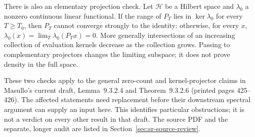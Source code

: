 There is also an elementary projection check.
Let \(\mathcal H\) be a Hilbert space and \(\lambda_0\) a nonzero
continuous linear functional.
If the range of \(P_T\) lies in \(\ker\lambda_0\) for every
\(T\geq T_0\), then \(P_T\) cannot converge strongly to the identity:
otherwise, for every \(x\),
\(\lambda_0(x)=\lim_T\lambda_0(P_Tx)=0\).
More generally intersections of an increasing collection of
evaluation kernels decrease as the collection grows.
Passing to complementary projectors changes the limiting subspace;
it does not prove density in the full space.

These two checks apply to the general zero-count and kernel-projector
claims in Masullo's current draft, Lemma~9.3.2.4 and
Theorem~9.3.2.6 (printed pages 425--426).
The affected statements need replacement before their downstream
spectral argument can supply an input here.
This identifies particular obstructions; it is not a verdict on every
other result in that draft.
The source PDF and the separate, longer audit are listed in
Section~\ref{sec:sr-source-review}.
